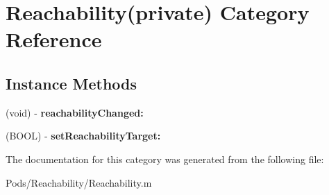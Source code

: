 \hypertarget{category_reachability_07private_08}{}\section{Reachability(private) Category Reference}
\label{category_reachability_07private_08}
\subsection*{Instance Methods}
\begin{DoxyCompactItemize}
\item 
\mbox{\label{category_reachability_07private_08_aaf4f3dd45270799244eba090991d114e}} 
(void) -\/ {\bfseries reachability\+Changed\+:}
\item 
\mbox{\label{category_reachability_07private_08_a6fc32cac9301927add307322a20b39b6}} 
(B\+O\+OL) -\/ {\bfseries set\+Reachability\+Target\+:}
\end{DoxyCompactItemize}


The documentation for this category was generated from the following file\+:\begin{DoxyCompactItemize}
\item 
Pods/\+Reachability/Reachability.\+m\end{DoxyCompactItemize}

